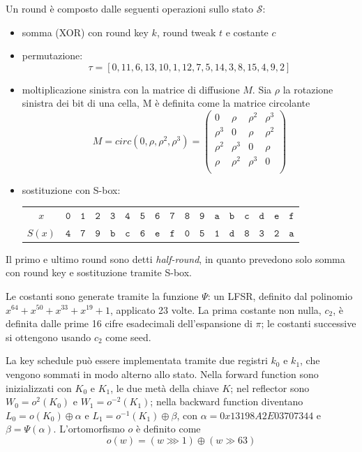 \documentclass[target=bach,aauheader=,style=]{thud}
\begin{document}
			Un round è composto dalle seguenti operazioni sullo stato $\mathcal{S}$:
			\begin{itemize}
				\item somma (XOR) con round key $k$, round tweak $t$ e costante $c$
				\item permutazione:
				\[\tau = [0,11,6,13,10,1,12,7,5,14,3,8,15,4,9,2]\]
				\item moltiplicazione sinistra con la matrice di diffusione $M$.
				Sia $\rho$ la rotazione sinistra dei bit di una cella, M è definita come la matrice circolante
				\[M =  circ(0, \rho, \rho ^2, \rho ^3) =
				\begin{pmatrix}
					0 & \rho & \rho ^2 & \rho ^3 \\
					\rho ^3 & 0 & \rho & \rho ^2 \\
					\rho ^2 & \rho ^3 & 0 & \rho \\
					\rho & \rho ^2 & \rho ^3 & 0 \\
				\end{pmatrix}
				\]
				\item sostituzione con S-box:
				\begin{center}
					\begin{tabular}{|c|cccccccccccccccc|}
						\hline
						$x$ & $\mathtt{0}$ & $\mathtt{1}$ & $\mathtt{2}$ & $\mathtt{3}$ & $\mathtt{4}$ & $\mathtt{5}$ & $\mathtt{6}$ & $\mathtt{7}$ & $\mathtt{8}$ & $\mathtt{9}$ & $\mathtt{a}$ & $\mathtt{b}$ & $\mathtt{c}$ & $\mathtt{d}$ & $\mathtt{e}$ & $\mathtt{f}$\\
						$S(x)$ & $\mathtt{4}$ & $\mathtt{7}$ & $\mathtt{9}$ & $\mathtt{b}$ & $\mathtt{c}$ & $\mathtt{6}$ & $\mathtt{e}$ & $\mathtt{f}$ & $\mathtt{0}$ & $\mathtt{5}$ & $\mathtt{1}$ & $\mathtt{d}$ & $\mathtt{8}$ & $\mathtt{3}$ & $\mathtt{2}$ & $\mathtt{a}$\\
						\hline
					\end{tabular}
				\end{center}
			\end{itemize}
			Il primo e ultimo round sono detti \textit{half-round}, in quanto prevedono solo somma con round key e sostituzione tramite S-box.
			
			Le costanti sono generate tramite la funzione $\Psi$: un LFSR, definito dal polinomio $x^{64} + x^{50} + x^{33} + x^{19} + 1$, applicato 23 volte. La prima costante non nulla, $c_2$, è definita dalle prime 16 cifre esadecimali dell'espansione di $\pi$; le costanti successive si ottengono usando $c_2$ come seed.
			
			La key schedule può essere implementata tramite due registri $k_0$ e $k_1$, che vengono sommati in modo alterno allo stato. Nella forward function sono inizializzati con $K_0$ e $K_1$, le due metà della chiave $K$; nel reflector sono $W_0 = o^2(K_0)$ e $W_1 = o^{-2}(K_1)$; nella backward function diventano $L_0 = o(K_0) \oplus \alpha$ e $L_1 = o^{-1}(K_1) \oplus \beta$, con $\alpha = 0x13198A2E03707344$ e $\beta = \Psi(\alpha)$. L'ortomorfismo $o$ è definito come
			\[o(w) = (w \ggg 1) \oplus (w \gg 63)\]
			
\end{document}

